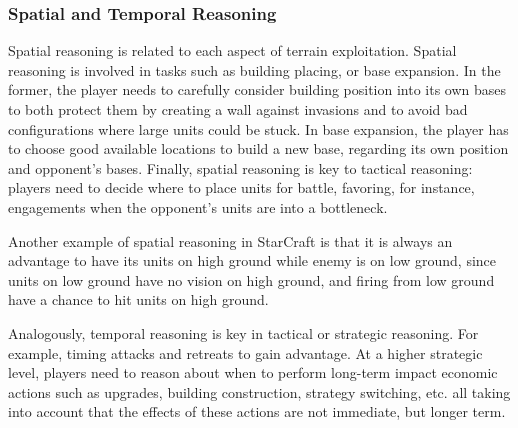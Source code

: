 \documentclass[journal]{IEEEtran}
\begin{document}
\subsubsection{Spatial and Temporal Reasoning}
Spatial  reasoning   is  related  to   each  aspect  of   terrain
exploitation.  Spatial reasoning is involved in tasks such as building placing, or base expansion. In the former, the player needs to
carefully  consider building  position  into its  own  bases to  both
protect them  by creating  a wall against  invasions and to  avoid bad
configurations  where large  units could  be stuck. In base expansion, the player has to
choose good available locations to  build a new base, regarding its
own  position  and opponent's  bases.  Finally,  spatial reasoning  is
key to tactical reasoning: players need to decide where to place units
for battle,  favoring, for  instance, engagements when  the opponent's
units are into a bottleneck. 

Another example of spatial reasoning in StarCraft is that it is always an advantage to  have its units  on high ground  while enemy is on low ground, since units  on low ground have no vision  on high ground, and firing from low ground have a chance to  hit units on high ground.

Analogously, temporal reasoning is key in tactical or strategic reasoning. For example, timing attacks and retreats to gain advantage. At a higher strategic level, players need to reason about when to perform long-term impact economic actions such as upgrades, building construction, strategy switching, etc. all taking into account that the effects of these actions are not immediate, but longer term.
\end{document}
